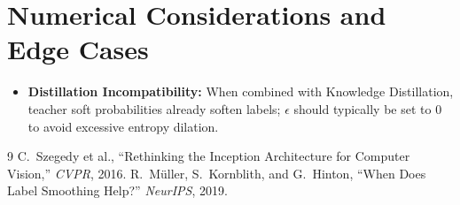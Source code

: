 \documentclass[11pt]{article}
\begin{document}
\section{Numerical Considerations and Edge Cases}
\label{sec:numerical}

\begin{itemize}
    \item \textbf{Distillation Incompatibility:} When combined with Knowledge Distillation, teacher soft probabilities already soften labels; $\epsilon$ should typically be set to $0$ to avoid excessive entropy dilation.
\end{itemize}

\begin{thebibliography}{9}
 C.~Szegedy et al., ``Rethinking the Inception Architecture for Computer Vision,'' \emph{CVPR}, 2016.
 R.~M{\"u}ller, S.~Kornblith, and G.~Hinton, ``When Does Label Smoothing Help?'' \emph{NeurIPS}, 2019.
\end{thebibliography}
\end{document}
